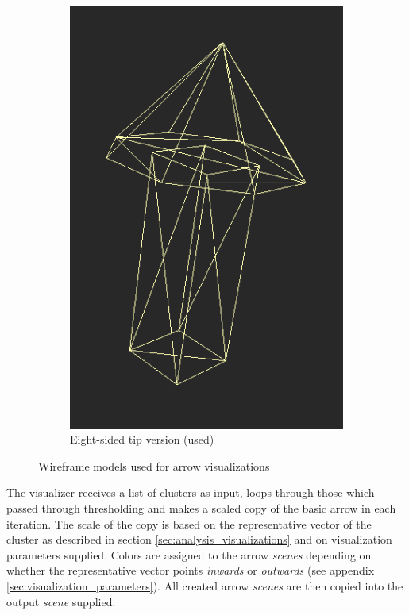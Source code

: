 \begin{figure}[h]
\begin{subfigure}{0.3\textwidth}
	\includegraphics[width=\textwidth]{./img/8sided_arrow.PNG}
    \caption{Eight-sided tip version (used)}
    \label{fig:8sided_arrow}
	\end{subfigure}
\caption[Wireframe models used for arrow visualizations]{Wireframe models used for arrow visualizations}
\end{figure}

The visualizer receives a list of clusters as input, loops through those which passed through thresholding and makes a scaled copy of the basic arrow in each iteration. The scale of the copy is based on the representative vector of the cluster as described in section \ref{sec:analysis_visualizations} and on visualization parameters supplied. Colors are assigned to the arrow {\it scenes} depending on whether the representative vector points {\it inwards} or {\it outwards} (see appendix \ref{sec:visualization_parameters}). All created arrow {\it scenes} are then copied into the output {\it scene} supplied.

